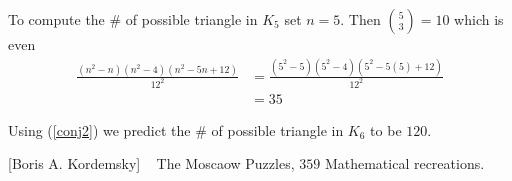 \documentclass[paper=a4, fontsize=12pt]{scrartcl} %
\theoremstyle{definition}
\theoremstyle{remark}
\begin{document}
To compute the $\#$ of possible triangle in $K_5$ set $n=5$. Then $\binom{5}{3}=10$ which is even
\begin{align*}
\frac{(n^2-n)(n^2-4)(n^2-5n+12)}{12^2} &=\frac{(5^2-5)(5^2-4)(5^2-5(5)+12)}{12^2}\\
                                       &=35
\end{align*}

Using (\ref{conj2}) we predict the $\#$ of possible triangle in $K_6$ to be $120$.


\newpage
\begin{thebibliography}{9}

[Boris A. Kordemsky] ~
The Moscaow Puzzles, $359$ Mathematical recreations.


\end{thebibliography}
\end{document}
